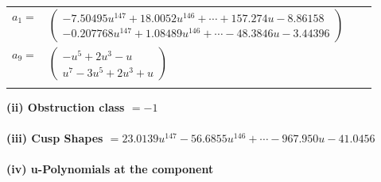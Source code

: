 \documentclass[1p]{elsarticle_modified}
\theoremstyle{definition}
\begin{document}
\begin{tabular}{m{7pt} m{180pt} m{7pt} m{180pt} }
\flushright $a_{1}=$&$\begin{pmatrix}-7.50495 u^{147}+18.0052 u^{146}+\cdots+157.274 u-8.86158\\-0.207768 u^{147}+1.08489 u^{146}+\cdots-48.3846 u-3.44396\end{pmatrix}$ \\
\flushright $a_{9}=$&$\begin{pmatrix}- u^5+2 u^3- u\\u^7-3 u^5+2 u^3+u\end{pmatrix}$\\&\end{tabular}
\flushleft \textbf{(ii) Obstruction class $= -1$}\\~\\
\flushleft \textbf{(iii) Cusp Shapes $= 23.0139 u^{147}-56.6855 u^{146}+\cdots-967.950 u-41.0456$}\\~\\
\newpage\renewcommand{\arraystretch}{1}
\flushleft \textbf{(iv) u-Polynomials at the component}\newline \\
\end{document}
